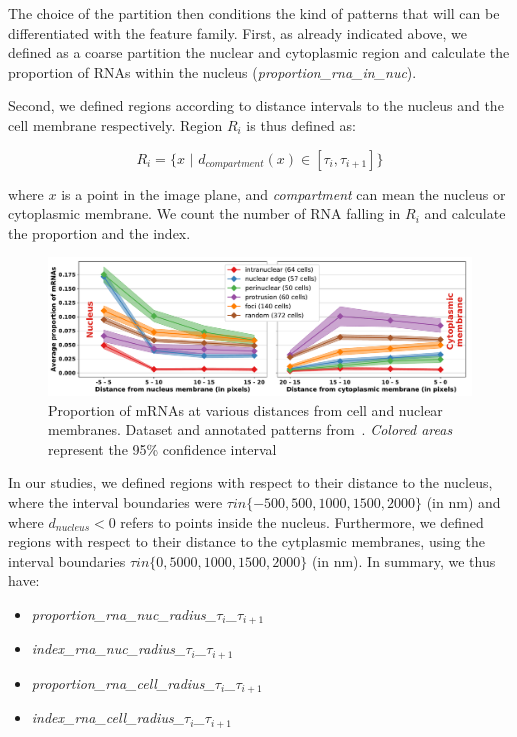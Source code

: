 The choice of the partition then conditions the kind of patterns that will can be differentiated with the feature family.
First, as already indicated above, we defined as a coarse partition the nuclear and cytoplasmic region and calculate the proportion of \ac{RNA}s within the nucleus (\emph{proportion\_rna\_in\_nuc}).

Second, we defined regions according to distance intervals to the nucleus and the cell membrane respectively.
Region $R_i$ is thus defined as:

\begin{equation}
    R_i = \{ x \, \, | \, \, d_{compartment}(x) \in  [\tau_i, \tau_{i+1}] \}
\end{equation}

\noindent
where $x$ is a point in the image plane, and \emph{compartment} can mean the nucleus or cytoplasmic membrane.
We count the number of \ac{RNA} falling in $R_i$ and calculate the proportion and the index. 

\begin{figure}[]
    \centering
    \includegraphics[width=\textwidth]{figures/chapter4/plot_topography}
    \caption[Proportion of mRNAs in several subcellular regions]{Proportion of mRNAs at various distances from cell and nuclear membranes.
    Dataset and annotated patterns from~\cite{CHOUAIB_2020}.
    \textit{Colored areas} represent the 95\% confidence interval}
    \label{fig:features_topography}
\end{figure}

In our studies, we defined regions with respect to their distance to the nucleus, where the interval boundaries were $\tau in \{-500, 500, 1000, 1500, 2000\}$ (in nm) and where $d_{nucleus} < 0$ refers to points inside the nucleus.
Furthermore, we defined regions with respect to their distance to the cytplasmic membranes, using the interval boundaries $\tau in \{0, 5000, 1000, 1500, 2000\}$ (in nm).
In summary, we thus have:

\begin{itemize}
	\setlength\itemsep{0.1em}
    \item \emph{proportion\_rna\_nuc\_radius\_$\tau_i$\_$\tau_{i+1}$}
    \item \emph{index\_rna\_nuc\_radius\_$\tau_i$\_$\tau_{i+1}$}
    \item \emph{proportion\_rna\_cell\_radius\_$\tau_i$\_$\tau_{i+1}$}
    \item \emph{index\_rna\_cell\_radius\_$\tau_i$\_$\tau_{i+1}$}
\end{itemize}

